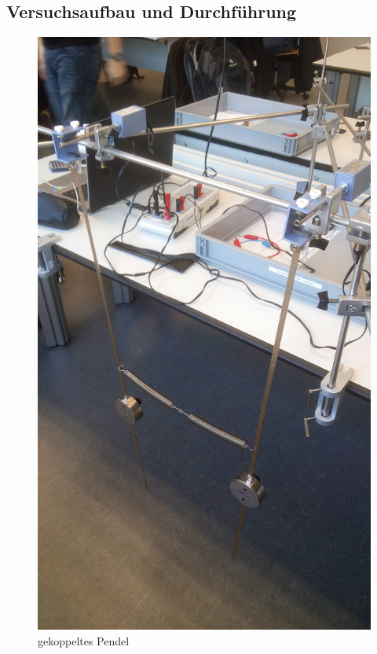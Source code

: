 \documentclass[12pt,a4paper]{article}
\begin{document}
\subsection{Versuchsaufbau und Durchführung}
\begin{figure}[H]
\centering
\includegraphics[scale=0.1]{Bilder/Doppelpendel.jpg}
\caption{gekoppeltes Pendel}
\end{figure}
\end{document}
